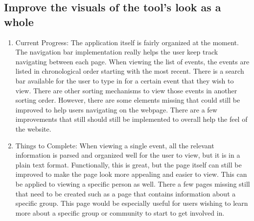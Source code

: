 \documentclass[letterpaper,10pt,onecolumn]{IEEEtran} %
\begin{document}
\subsection{Improve the visuals of the tool's look as a whole}
\begin{enumerate}[label*=\arabic*.]
  \item Current Progress: The application itself is fairly organized at the
    moment. The navigation bar implementation really helps the user keep track
    navigating between each page. When viewing the list of events, the events are
    listed in chronological order starting with the most recent. There is a search
    bar available for the user to type in for a certain event that they wish to
    view. There are other sorting mechanisms to view those events in another
    sorting order. However, there are some elements missing that could still be
    improved to help users navigating on the webpage. There are a few improvements
    that still should still be implemented to overall help the feel of the
    website.

  \item Things to Complete: When viewing a single event, all the relevant
    information is parsed and organized well for the user to view, but it is in a
    plain text format. Functionally, this is great, but the page itself can still
    be improved to make the page look more appealing and easier to view. This can
    be applied to viewing a specific person as well. There a few pages missing
    still that need to be created such as a page that contains information about a
    specific group. This page would be especially useful for users wishing to
    learn more about a specific group or community to start to get involved in.
\end{enumerate}
\end{document}
